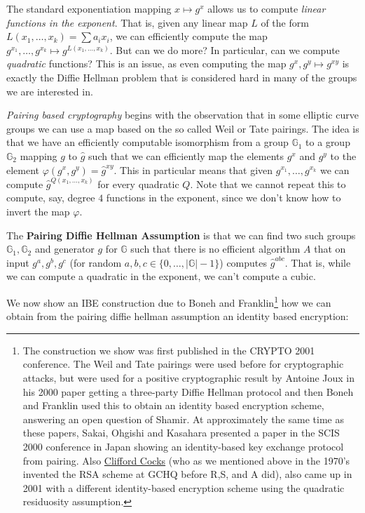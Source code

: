 The standard exponentiation mapping \(x \mapsto g^x\) allows us to
compute \emph{linear functions in the exponent}. That is, given any
linear map \(L\) of the form \(L(x_1,\ldots,x_k) = \sum a_i x_i\), we
can efficiently compute the map
\(g^{x_1},\ldots, g^{x_k} \mapsto g^{L(x_1,\ldots,x_k)}\). But can we do
more? In particular, can we compute \emph{quadratic} functions? This is
an issue, as even computing the map \(g^x,g^y \mapsto g^{xy}\) is
exactly the Diffie Hellman problem that is considered hard in many of
the groups we are interested in.

\emph{Pairing based cryptography} begins with the observation that in
some elliptic curve groups we can use a map based on the so called Weil
or Tate pairings. The idea is that we have an efficiently computable
isomorphism from a group \(\mathbb{G}_1\) to a group \(\mathbb{G}_2\)
mapping \(g\) to \(\hat{g}\) such that we can efficiently map the
elements \(g^x\) and \(g^y\) to the element
\(\varphi(g^x,g^y)=\hat{g}^{xy}\). This in particular means that given
\(g^{x_1},\ldots,g^{x_k}\) we can compute
\(\hat{g}^{Q(x_1,\ldots,x_k)}\) for every quadratic \(Q\). Note that we
cannot repeat this to compute, say, degree \(4\) functions in the
exponent, since we don't know how to invert the map \(\varphi\).

The \textbf{Pairing Diffie Hellman Assumption} is that we can find two
such groups \(\mathbb{G}_1,\mathbb{G}_2\) and generator \(g\) for
\(\mathbb{G}\) such that there is no efficient algorithm \(A\) that on
input \(g^a,g^b,g^c\) (for random
\(a,b,c \in \{0,\ldots,|\mathbb{G}|-1\}\)) computes \(\hat{g}^{abc}\).
That is, while we can compute a quadratic in the exponent, we can't
compute a cubic.

We now show an IBE construction due to Boneh and Franklin\footnote{The
  construction we show was first published in the CRYPTO 2001
  conference. The Weil and Tate pairings were used before for
  cryptographic attacks, but were used for a positive cryptographic
  result by Antoine Joux in his 2000 paper getting a three-party Diffie
  Hellman protocol and then Boneh and Franklin used this to obtain an
  identity based encryption scheme, answering an open question of
  Shamir. At approximately the same time as these papers, Sakai, Ohgishi
  and Kasahara presented a paper in the SCIS 2000 conference in Japan
  showing an identity-based key exchange protocol from pairing. Also
  \href{https://en.wikipedia.org/wiki/Clifford_Cocks}{Clifford Cocks}
  (who as we mentioned above in the 1970's invented the RSA scheme at
  GCHQ before R,S, and A did), also came up in 2001 with a different
  identity-based encryption scheme using the quadratic residuosity
  assumption.} how we can obtain from the pairing diffie hellman
assumption an identity based encryption:


